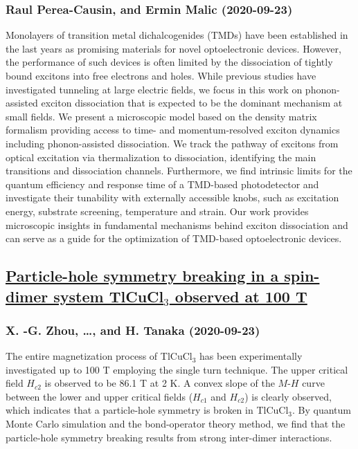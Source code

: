 \subsubsection*{Raul Perea-Causin, and Ermin Malic (2020-09-23)}
Monolayers of transition metal dichalcogenides (TMDs) have been established
in the last years as promising materials for novel optoelectronic devices.
However, the performance of such devices is often limited by the dissociation
of tightly bound excitons into free electrons and holes. While previous studies
have investigated tunneling at large electric fields, we focus in this work on
phonon-assisted exciton dissociation that is expected to be the dominant
mechanism at small fields. We present a microscopic model based on the density
matrix formalism providing access to time- and momentum-resolved exciton
dynamics including phonon-assisted dissociation. We track the pathway of
excitons from optical excitation via thermalization to dissociation,
identifying the main transitions and dissociation channels. Furthermore, we
find intrinsic limits for the quantum efficiency and response time of a
TMD-based photodetector and investigate their tunability with externally
accessible knobs, such as excitation energy, substrate screening, temperature
and strain. Our work provides microscopic insights in fundamental mechanisms
behind exciton dissociation and can serve as a guide for the optimization of
TMD-based optoelectronic devices.

\subsection*{\href{http://arxiv.org/abs/2009.11028v2}{Particle-hole symmetry breaking in a spin-dimer system TlCuCl$_3$  observed at 100 T}}
\subsubsection*{X. -G. Zhou, \dots, and H. Tanaka (2020-09-23)}
The entire magnetization process of TlCuCl$_3$ has been experimentally
investigated up to 100 T employing the single turn technique. The upper
critical field $H_{c2}$ is observed to be 86.1 T at 2 K. A convex slope of the
$M$-$H$ curve between the lower and upper critical fields ($H_{c1}$ and
$H_{c2}$) is clearly observed, which indicates that a particle-hole symmetry is
broken in TlCuCl$_3$. By quantum Monte Carlo simulation and the bond-operator
theory method, we find that the particle-hole symmetry breaking results from
strong inter-dimer interactions.

